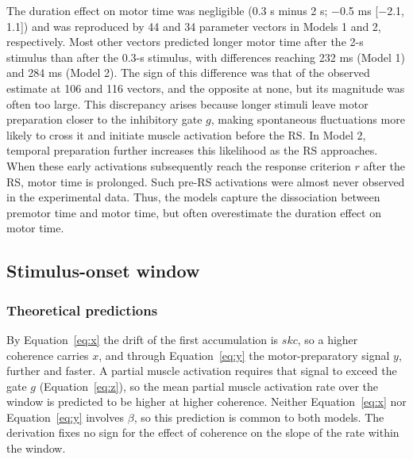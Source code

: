 \documentclass[a4paper,11pt]{article}
\theoremstyle{definition}
\newcommand{\1}{\mathbbm{1}}
\begin{document}
The duration effect on motor time was negligible (0.3 s minus 2 s; $-$0.5 ms [$-$2.1, 1.1]) and was reproduced by 44 and 34 parameter vectors in Models 1 and 2, respectively. Most other vectors predicted longer motor time after the 2-s stimulus than after the 0.3-s stimulus, with differences reaching 232 ms (Model 1) and 284 ms (Model 2). The sign of this difference was that of the observed estimate at 106 and 116 vectors, and the opposite at none, but its magnitude was often too large. This discrepancy arises because longer stimuli leave motor preparation closer to the inhibitory gate $g$, making spontaneous fluctuations more likely to cross it and initiate muscle activation before the RS. In Model 2, temporal preparation further increases this likelihood as the RS approaches. When these early activations subsequently reach the response criterion $r$ after the RS, motor time is prolonged. Such pre-RS activations were almost never observed in the experimental data. Thus, the models capture the dissociation between premotor time and motor time, but often overestimate the duration effect on motor time.


\subsection{Stimulus-onset window}


\subsubsection{Theoretical predictions}

By Equation~\eqref{eq:x} the drift of the first accumulation is $skc$, so a higher coherence carries $x$, and through Equation~\eqref{eq:y} the motor-preparatory signal $y$, further and faster. A partial muscle activation requires that signal to exceed the gate $g$ (Equation~\eqref{eq:z}), so the mean partial muscle activation rate over the window is predicted to be higher at higher coherence. Neither Equation~\eqref{eq:x} nor Equation~\eqref{eq:y} involves $\beta$, so this prediction is common to both models. The derivation fixes no sign for the effect of coherence on the slope of the rate within the window.
\end{document}
